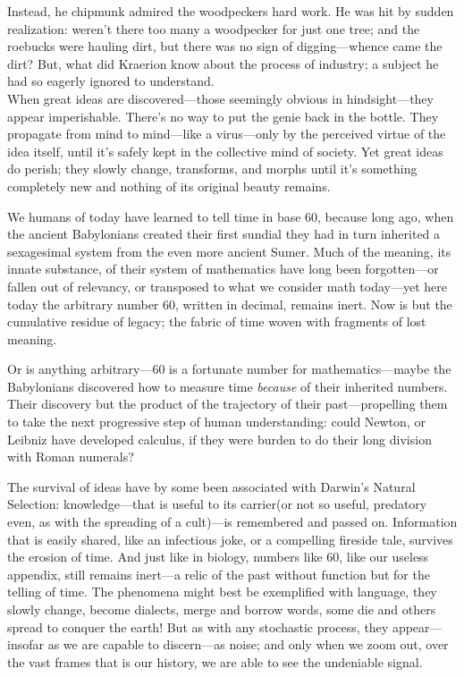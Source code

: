 Instead, he chipmunk admired the woodpeckers hard work. He was hit by sudden realization: weren't there too many a woodpecker for just one tree; and the roebucks were hauling dirt, but there was no sign of digging---whence came the dirt? But, what did Kraerion know about the process of industry; a subject he had so eagerly ignored to understand.\\

When great ideas are discovered---those seemingly obvious in hindsight---they appear imperishable. There's no way to put the genie back in the bottle. They propagate from mind to mind---like a virus---only by the perceived virtue of the idea itself, until it's safely kept in the collective mind of society. Yet great ideas do perish; they slowly change, transforms, and morphs until it's something completely new and nothing of its original beauty remains.

We humans of today have learned to tell time in base 60, because long ago, when the ancient Babylonians created their first sundial they had in turn inherited a sexagesimal system from the even more ancient Sumer. Much of the meaning, its innate substance, of their system of mathematics have long been forgotten---or fallen out of relevancy, or transposed to what we consider math today---yet here today the arbitrary number 60, written in decimal, remains inert. Now is but the cumulative residue of legacy; the fabric of time woven with fragments of lost meaning.

Or is anything arbitrary---60 is a fortunate number for mathematics---maybe the Babylonians discovered how to measure time \textit{because} of their inherited numbers. Their discovery but the product of the trajectory of their past---propelling them to take the next progressive step of human understanding: could Newton, or Leibniz have developed calculus, if they were burden to do their long division with Roman numerals?

The survival of ideas have by some been associated with Darwin's Natural Selection: knowledge---that is useful to its carrier(or not so useful, predatory even, as with the spreading of a cult)---is remembered and passed on. Information that is easily shared, like an infectious joke, or a compelling fireside tale, survives the erosion of time. And just like in biology, numbers like 60, like our useless appendix, still remains inert---a relic of the past without function but for the telling of time. The phenomena might best be exemplified with language, they slowly change, become dialects, merge and borrow words, some die and others spread to conquer the earth! But as with any stochastic process, they appear---insofar as we are capable to discern---as noise; and only when we zoom out, over the vast frames that is our history, we are able to see the undeniable signal.

